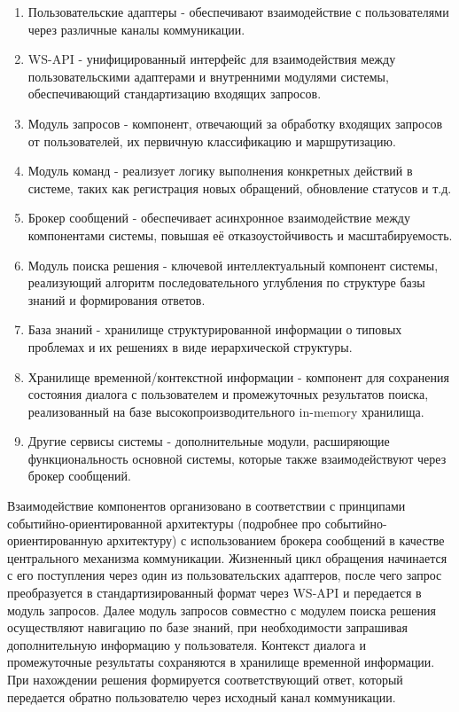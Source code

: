 \begin{enumerate}[label=\arabic*.]
    \item Пользовательские адаптеры - обеспечивают взаимодействие с пользователями через различные каналы коммуникации.
    \item WS-API - унифицированный интерфейс для взаимодействия между пользовательскими адаптерами и внутренними модулями системы, обеспечивающий стандартизацию входящих запросов.
    \item Модуль запросов - компонент, отвечающий за обработку входящих запросов от пользователей, их первичную классификацию и маршрутизацию.
    \item Модуль команд - реализует логику выполнения конкретных действий в системе, таких как регистрация новых обращений, обновление статусов и т.д.
    \item Брокер сообщений - обеспечивает асинхронное взаимодействие между компонентами системы, повышая её отказоустойчивость и масштабируемость.
    \item Модуль поиска решения - ключевой интеллектуальный компонент системы, реализующий алгоритм последовательного углубления по структуре базы знаний и формирования ответов.
    \item База знаний - хранилище структурированной информации о типовых проблемах и их решениях в виде иерархической структуры.
    \item Хранилище временной/контекстной информации - компонент для сохранения состояния диалога с пользователем и промежуточных результатов поиска, реализованный на базе высокопроизводительного in-memory хранилища.
    \item Другие сервисы системы - дополнительные модули, расширяющие функциональность основной системы, которые также взаимодействуют через брокер сообщений.
\end{enumerate}

Взаимодействие компонентов организовано в соответствии с принципами событийно-ориентированной архитектуры (подробнее про событийно-ориентированную архитектуру\cite{stopford2018designing}) с использованием брокера сообщений в качестве центрального механизма коммуникации. Жизненный цикл обращения начинается с его поступления через один из пользовательских адаптеров, после чего запрос преобразуется в стандартизированный формат через WS-API и передается в модуль запросов. Далее модуль запросов совместно с модулем поиска решения осуществляют навигацию по базе знаний, при необходимости запрашивая дополнительную информацию у пользователя. Контекст диалога и промежуточные результаты сохраняются в хранилище временной информации. При нахождении решения формируется соответствующий ответ, который передается обратно пользователю через исходный канал коммуникации.

